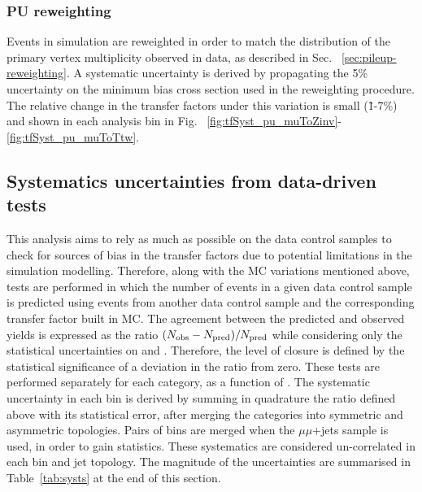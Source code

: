 \subsubsection*{PU reweighting}
\label{sec:tfSyst_pu}

Events in simulation are reweighted in order to match the distribution 
of the primary vertex multiplicity observed in data, as described in Sec. ~\ref{sec:pileup-reweighting}.
A systematic uncertainty is derived by propagating 
the 5\% uncertainty on the minimum bias cross section used in the reweighting procedure. 
The relative change in the transfer factors under this variation is
small (\~1-7\%)
and shown in each analysis bin in Fig. ~\ref{fig:tfSyst_pu_muToZinv}-\ref{fig:tfSyst_pu_muToTtw}.


\subsection{Systematics uncertainties from data-driven tests}
\label{sec:closure-tests}
This analysis aims to rely as much as possible on the data control samples
to check for sources of bias in the transfer factors due to potential limitations in
the simulation modelling. 
Therefore, along with the MC variations mentioned above, tests are performed 
in which the number of events in a given data control sample is predicted 
using events from another data control sample and the corresponding transfer factor built in MC. 
The agreement between the predicted and observed yields is
expressed as the ratio $(N_{\textrm{obs}} - N_{\textrm{pred}})/N_{\textrm{pred}}$ while considering only
the statistical uncertainties on \npre and \nobs. Therefore, the level
of closure is defined by the statistical significance of a deviation
in the ratio from zero.
These tests are performed separately for each \njet category, as a function of \scalht. 
The systematic uncertainty in each \scalht bin is derived by summing in quadrature the ratio 
defined above with its statistical error, after merging the \njet categories into symmetric and asymmetric topologies. 
Pairs of \scalht bins are merged when the $\mu\mu$+jets sample is used, in order to gain statistics. 
These systematics are considered un-correlated in each \scalht bin and jet topology. 
The magnitude of the uncertainties are summarised in Table~\ref{tab:systs} at
the end of this section. 

